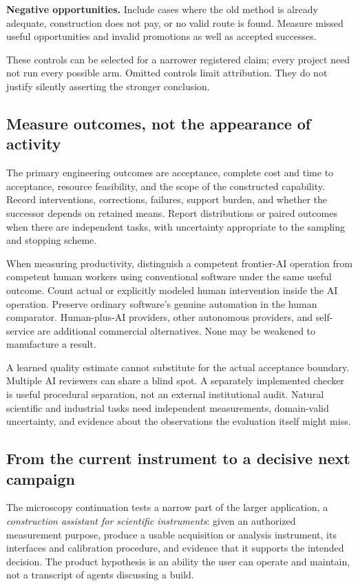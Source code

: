 \textbf{Negative opportunities.} Include cases where the old method is already adequate, construction does not pay, or no valid route is found. Measure missed useful opportunities and invalid promotions as well as accepted successes.

These controls can be selected for a narrower registered claim; every project need not run every possible arm. Omitted controls limit attribution. They do not justify silently asserting the stronger conclusion.

\subsection{Measure outcomes, not the appearance of activity}

The primary engineering outcomes are acceptance, complete cost and time to acceptance, resource feasibility, and the scope of the constructed capability. Record interventions, corrections, failures, support burden, and whether the successor depends on retained means. Report distributions or paired outcomes when there are independent tasks, with uncertainty appropriate to the sampling and stopping scheme.

When measuring productivity, distinguish a competent frontier-AI operation from competent human workers using conventional software under the same useful outcome. Count actual or explicitly modeled human intervention inside the AI operation. Preserve ordinary software's genuine automation in the human comparator. Human-plus-AI providers, other autonomous providers, and self-service are additional commercial alternatives. None may be weakened to manufacture a result.

A learned quality estimate cannot substitute for the actual acceptance boundary. Multiple AI reviewers can share a blind spot. A separately implemented checker is useful procedural separation, not an external institutional audit. Natural scientific and industrial tasks need independent measurements, domain-valid uncertainty, and evidence about the observations the evaluation itself might miss.

\subsection{From the current instrument to a decisive next campaign}

The microscopy continuation tests a narrow part of the larger application, a \emph{construction assistant for scientific instruments}: given an authorized measurement purpose, produce a usable acquisition or analysis instrument, its interfaces and calibration procedure, and evidence that it supports the intended decision. The product hypothesis is an ability the user can operate and maintain, not a transcript of agents discussing a build.

